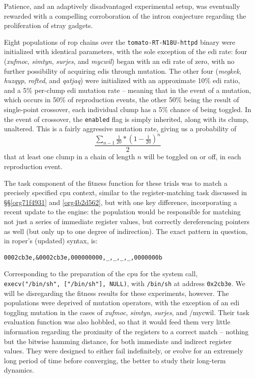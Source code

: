 \documentclass[12pt,glossary]{dalthesis}
\begin{document}
Patience, and an adaptively disadvantaged experimental setup, was eventually
rewarded with a compelling corroboration of the intron conjecture regarding
the proliferation of stray gadgets. 

Eight populations of \gls{rop} chains over the \texttt{tomato-RT-N18U-httpd} binary were
initialized with identical parameters, with the sole exception of the \gls{edi}
rate: four (\emph{xufmoc}, \emph{simtyn}, \emph{surjes}, and \emph{mycwil}) began with an \gls{edi}
rate of zero, with no further possibility of acquiring \glspl{edi} through
mutation. The other four (\emph{megkek}, \emph{huzqyp}, \emph{rofted}, and \emph{qatjaq}) were
initialized with an approximate 10\% \gls{edi} ratio, and a 5\% per-clump \gls{edi}
mutation rate -- meaning that in the event of a mutation, which occurs in 50\% of
reproduction events, the other 50\% being the result of single-point crossover,
each individual clump has a 5\% chance of being toggled. In the event of
crossover, the \texttt{enabled} flag is simply inherited, along with its clump,
unaltered. This is a fairly aggressive mutation rate, giving us a probability of
$$ \frac{\sum_{n-1} \frac{1}{20} * (1 - \frac{1}{20})^n}{2} $$ that at least one
clump in a chain of length \(n\) will be toggled on or off, in each reproduction
event.

The task component of the fitness function for these trials was to match a
precisely specified \gls{cpu} context, similar to the register-matching task
discussed in \S\S \ref{org71f4931} and \ref{org4b2d562}, but
with one key difference, incorporating a recent update to the engine: the
population would be responsible for matching not just a series of immediate
register values, but correctly dereferencing pointers as well (but only up to
one degree of indirection). The exact
pattern in question, in \gls{roper}'s (updated) syntax, is:
\begin{verbatim}
0002cb3e,&0002cb3e,000000000,_,_,_,_,0000000b
\end{verbatim}
Corresponding to the preparation of the \gls{cpu} for the system call,
\texttt{execv("/bin/sh", ["/bin/sh"], NULL)}, with \texttt{/bin/sh} at address
\texttt{0x2cb3e}. We will be disregarding the fitness results for these experiments,
however. The populations were deprived of mutation operators, with the exception
of an \gls{edi} toggling mutation in the cases of \emph{xufmoc}, \emph{simtyn}, \emph{surjes}, and
/mycwil. Their task evaluation function was also hobbled, so that it would feed
them very little information regarding the proximity of the registers to a correct match -- nothing but the bitwise hamming distance, for both immediate and indirect register
values. They were designed to either fail indefinitely, or evolve for an extremely
long period of time before converging, the better to study their long-term
dynamics. 
\end{document}
